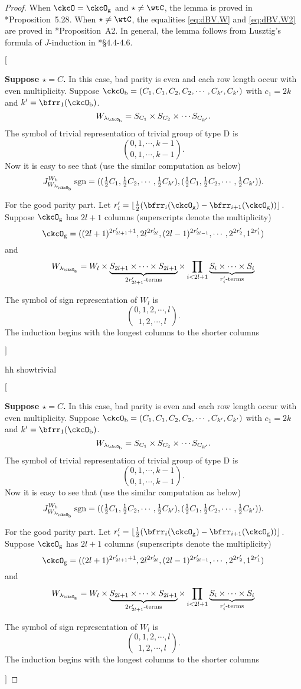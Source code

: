 \documentclass[12pt,a4paper]{amsart}
\newcommand{\trivial}[2][]{\if\relax\detokenize{#1}\relax
  {%
      \color{orange} \vspace{0em} $[$  #2 $]$
      \color{black}
  }
  \else
\ifx#1h
\ifcsname showtrivial\endcsname
{%
    \color{orange} \vspace{0em}  $[$ #2 $]$
    \color{black}
}
\fi
\else {\red Wrong argument!} \fi
\fi
}
\newcommand{\sgn}{\operatorname{sgn}}
\numberwithin{equation}{section}
\theoremstyle{remark}
\def\half{{\tfrac{1}{2}}}
\def\floor#1{{\lfloor #1 \rfloor}}
\def\lamckb{\lambda_{\ckcO_{\mathrm b}}}
\def\lamckg{\lambda_{\ckcO_{\mathrm g}}}
\begin{document}
  \begin{proof}
    When  $\ckcO=\ckcO_{\mathrm g}$ and $\star\neq \wtC$, the lemma is proved in \cite{BVUni}*{Proposition~5.28}.  When $\star\neq \wtC$, the equalities
    \eqref{eq:dBV.W} and \eqref{eq:dBV.W2} are proved in \cite{BVUni}*{Proposition~A2}. In general, the lemma follows from
    Lusztig's formula of $J$-induction in \cite{Lu}*{\S 4.4-4.6}.

    \trivial[h]{{ {\bf Suppose $\star=C$.}
      In this case, bad parity is even and each row length occur with even
      multiplicity. Suppose
      $\ckcO_{\mathrm b} = (C_{1}, C_{1}, C_{2},C_{2}, \cdots, C_{k'},C_{k'})$ with
      $c_{1}=2k$ and $k' = \bfrr_{1}(\ckcO_{\mathrm b})$.
      \[
        W_{\lamckb} = S_{C_{1}}\times S_{C_{2}}\times \cdots S_{C_{k'}}.
      \]
      The symbol of trivial representation of trivial group of type D is
      \[
        \binom{0,1, \cdots, k-1}{0,1, \cdots, k-1}.
      \]
      Now it is easy to see that (use the similar computation as below)
      \[
        J_{W_{\lamckb}}^{W_{\mathrm b}}\sgn = ((\half C_{1}, \half C_{2},\cdots, \half C_{k'}),(\half C_{1}, \half C_{2},\cdots, \half C_{k'})).
      \]


      For the good parity part. Let
      $r'_{i} = \floor{\half(\bfrr_{i}(\ckcO_{\mathrm g})-\bfrr_{i+1}(\ckcO_{\mathrm g}))}$.
      Suppose $\ckcO_{\mathrm g}$ has $2l+1$ columns (superscripts denote the
      multiplicity)
      \[
        \ckcO_{\mathrm g} = ((2l+1)^{2r'_{2l+1}+1}, 2l^{2r'_{2l}}, (2l-1)^{2r'_{2l-1}}, \cdots, 2^{2r'_{2}}, 1^{2r'_{1}} )
      \]
      and
      \[
        W_{\lamckg} = W_{l}\times \underbrace{S_{2l+1}\times \cdots \times S_{2l+1}}_{2r'_{2l+1}\text{-terms}} \times \prod_{i<2l+1} \underbrace{S_{i}\times \cdots\times S_{i}}_{r'_{i}\text{-terms}}
      \]

      The symbol of sign representation of $W_{l}$ is
      \[
        \binom{0,1,2, \cdots, l}{1,2, \cdots, l}.
      \]
      The induction begins with the longest columns to the shorter columns

}}
\end{proof}
\end{document}
